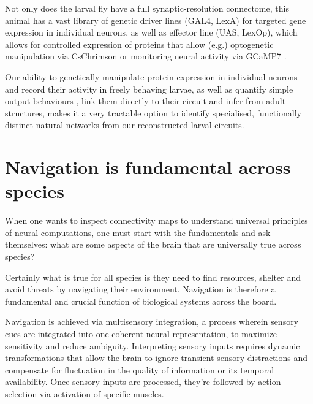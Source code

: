 Not only does the larval fly have a full synaptic-resolution connectome, this animal has a vast library of genetic driver lines (GAL4, LexA) for targeted gene expression in individual neurons, as well as effector line (UAS, LexOp), which allows for controlled expression of proteins that allow (e.g.) optogenetic manipulation via CsChrimson \citep{kim2015optogenetics} or monitoring neural activity via GCaMP7 \citep{owald2015light}. 

Our ability to genetically manipulate protein expression in individual neurons and record their activity in freely behaving larvae, as well as quantify simple output behaviours \citep{vogelstein2014discovery}, link them directly to their circuit and infer from adult structures, makes it a very tractable option to identify specialised, functionally distinct natural networks from our reconstructed larval circuits. %





\label{}


\section{Navigation is fundamental across species} 
    When one wants to inspect connectivity maps to understand universal principles of neural computations, one must start with the fundamentals and ask themselves: what are some aspects of the brain that are universally true across species? 

    Certainly what is true for all species is they need to find resources, shelter and avoid threats by navigating their environment. Navigation is therefore a fundamental and crucial function of biological systems across the board. 

    Navigation is achieved via multisensory integration, a process wherein sensory cues are integrated into one coherent neural representation, to maximize sensitivity and reduce ambiguity. Interpreting sensory inputs requires dynamic transformations that allow the brain to ignore transient sensory distractions and compensate for fluctuation in the quality of information or its temporal availability. Once sensory inputs are processed, they're followed by action selection via activation of specific muscles. 
    
